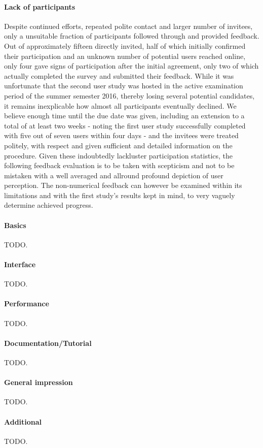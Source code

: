 \paragraph{Lack of participants} Despite continued efforts, repeated polite contact and larger number of invitees, only a unsuitable fraction of participants followed through and provided feedback. Out of approximately fifteen directly invited, half of which initially confirmed their participation and an unknown number of potential users reached online, only four gave signs of participation after the initial agreement, only two of which actually completed the survey and submitted their feedback. 
While it was unfortunate that the second user study was hosted in the active examination period of the summer semester 2016, thereby losing several potential candidates, it remains inexplicable how almost all participants eventually declined. We believe enough time until the due date was given, including an extension to a total of at least two weeks - noting the first user study successfully completed with five out of seven users within four days - and the invitees were treated politely, with respect and given sufficient and detailed information on the procedure. 
Given these indoubtedly lackluster participation statistics, the following feedback evaluation is to be taken with scepticism and not to be mistaken with a well averaged and allround profound depiction of user perception. The non-numerical feedback can however be examined within its limitations and with the first study's results kept in mind, to very vaguely determine achieved progress.
\paragraph{Basics} TODO.
\paragraph{Interface} TODO.
\paragraph{Performance} TODO.
\paragraph{Documentation/Tutorial} TODO.
\paragraph{General impression} TODO.
\paragraph{Additional} TODO.

